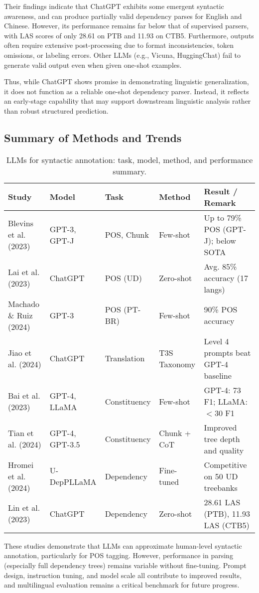 Their findings indicate that ChatGPT exhibits some emergent syntactic awareness, and can produce partially valid dependency parses for English and Chinese. However, its performance remains far below that of supervised parsers, with LAS scores of only 28.61 on PTB and 11.93 on CTB5. Furthermore, outputs often require extensive post-processing due to format inconsistencies, token omissions, or labeling errors. Other LLMs (e.g., Vicuna, HuggingChat) fail to generate valid output even when given one-shot examples.

Thus, while ChatGPT shows promise in demonstrating linguistic generalization, it does not function as a reliable one-shot dependency parser. Instead, it reflects an early-stage capability that may support downstream linguistic analysis rather than robust structured prediction.

\subsection{Summary of Methods and Trends}

\begin{table}[ht]
\centering
\begin{tabular}{p{3.3cm} p{2cm} p{2cm} p{2.5cm} p{3.5cm}}
\toprule
\textbf{Study} & \textbf{Model} & \textbf{Task} & \textbf{Method} & \textbf{Result / Remark} \\
\midrule
Blevins et al. (2023) & GPT-3, GPT-J & POS, Chunk & Few-shot & Up to 79\% POS (GPT-J); below SOTA \\
Lai et al. (2023) & ChatGPT & POS (UD) & Zero-shot & Avg. 85\% accuracy (17 langs) \\
Machado \& Ruiz (2024) & GPT-3 & POS (PT-BR) & Few-shot & 90\% POS accuracy \\
Jiao et al. (2024) & ChatGPT & Translation & T3S Taxonomy & Level 4 prompts beat GPT-4 baseline \\
Bai et al. (2023) & GPT-4, LLaMA & Constituency & Few-shot & GPT-4: 73 F1; LLaMA: $<$30 F1 \\
Tian et al. (2024) & GPT-4, GPT-3.5 & Constituency & Chunk + CoT & Improved tree depth and quality \\
Hromei et al. (2024) & U-DepPLLaMA & Dependency & Fine-tuned & Competitive on 50 UD treebanks \\
Lin et al. (2023) & ChatGPT & Dependency & Zero-shot & 28.61 LAS (PTB), 11.93 LAS (CTB5) \\
\bottomrule
\end{tabular}
\caption{LLMs for syntactic annotation: task, model, method, and performance summary.}
\label{tab:llm_syntax}
\end{table}

These studies demonstrate that LLMs can approximate human-level syntactic annotation, particularly for POS tagging. However, performance in parsing (especially full dependency trees) remains variable without fine-tuning. Prompt design, instruction tuning, and model scale all contribute to improved results, and multilingual evaluation remains a critical benchmark for future progress.



